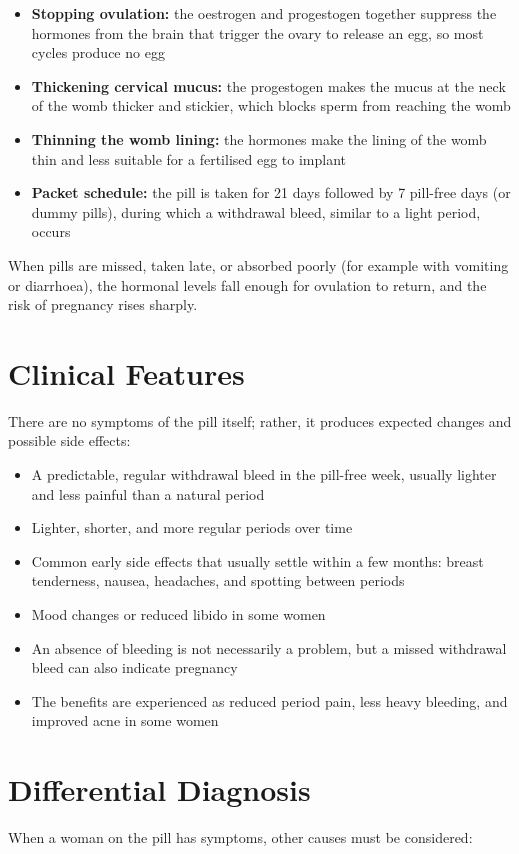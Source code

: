 \begin{itemize}
    \item \textbf{Stopping ovulation:} the oestrogen and progestogen together suppress the hormones from the brain that trigger the ovary to release an egg, so most cycles produce no egg
    \item \textbf{Thickening cervical mucus:} the progestogen makes the mucus at the neck of the womb thicker and stickier, which blocks sperm from reaching the womb
    \item \textbf{Thinning the womb lining:} the hormones make the lining of the womb thin and less suitable for a fertilised egg to implant
    \item \textbf{Packet schedule:} the pill is taken for 21 days followed by 7 pill-free days (or dummy pills), during which a withdrawal bleed, similar to a light period, occurs
\end{itemize}

When pills are missed, taken late, or absorbed poorly (for example with vomiting or diarrhoea), the hormonal levels fall enough for ovulation to return, and the risk of pregnancy rises sharply.

\section*{Clinical Features}
There are no symptoms of the pill itself; rather, it produces expected changes and possible side effects:

\begin{itemize}
    \item A predictable, regular withdrawal bleed in the pill-free week, usually lighter and less painful than a natural period
    \item Lighter, shorter, and more regular periods over time
    \item Common early side effects that usually settle within a few months: breast tenderness, nausea, headaches, and spotting between periods
    \item Mood changes or reduced libido in some women
    \item An absence of bleeding is not necessarily a problem, but a missed withdrawal bleed can also indicate pregnancy
    \item The benefits are experienced as reduced period pain, less heavy bleeding, and improved acne in some women
\end{itemize}

\section*{Differential Diagnosis}
When a woman on the pill has symptoms, other causes must be considered:

